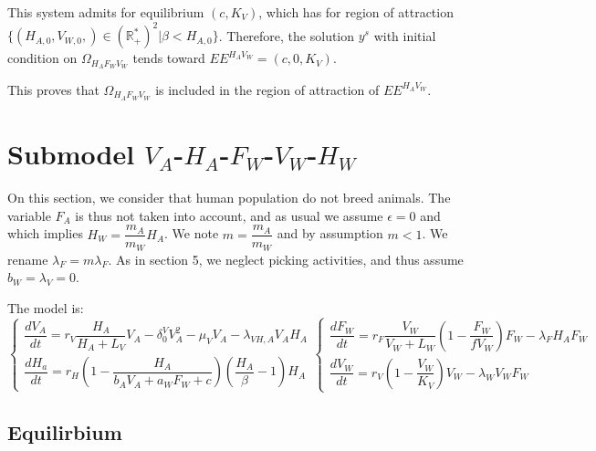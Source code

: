 \documentclass{article}
\newcommand{\lfw}{\lambda_{F}}
\newcommand{\lvw}{\lambda_{V}}
\newcommand{\lfv}{\lambda_{W}}
\begin{document}
This system admits for equilibrium $(c, K_V)$, which has for region of attraction $\Big\{(H_{A, 0}, V_{W, 0},) \in (\mathbb{R}_+^*)^2 | \beta < H_{A, 0} \Big\}$.  Therefore, the solution $y^s$ with initial condition on $\Omega_{H_AF_WV_W}$ tends toward $EE^{H_AV_W} = (c, 0, K_V)$.


This proves that $\Omega_{H_AF_WV_W}$ is included in the region of attraction of $EE^{H_AV_W}$.

\newpage
\section{Submodel $V_A$-$H_A$-$F_W$-$V_W$-$H_W$}
On this section, we consider that human population do not breed animals. The variable $F_A$ is thus not taken into account, and as usual we assume $\epsilon = 0$ and which implies $H_W = \dfrac{m_A}{m_W}H_A$. We note $m = \dfrac{m_A}{m_W}$ and by assumption $m < 1$. We rename $\lfw = m \lfw$. As in section 5, we neglect picking activities, and thus assume $b_W = \lvw = 0$.

The model is:
\begin{subequations}
\begin{equation}
\left\lbrace \begin{array}{l}
\dfrac{dV_{A}}{dt}=r_V  \dfrac{H_A}{H_A+L_V}V_A - \delta_0^V V_A^2-\mu_{V}V_A-\lambda_{VH,A}V_AH_A \\
\dfrac{dH_{a}}{dt}=r_{H}\left(1-\dfrac{H_A}{b_A V_A + a_{W}F_{W}+c}\right)\left(\dfrac{H_{A}}{\beta}-1\right)H_{A}
\end{array} \right.
\end{equation}
\begin{equation}
\left\lbrace \begin{array}{l}
\dfrac{dF_W}{dt} = r_F \dfrac{V_W}{V_W + L_W} \left(1 - \dfrac{F_W}{f V_W}\right) F_W - \lfw H_A F_W\\
\dfrac{dV_W}{dt} = r_V \left(1 - \dfrac{V_W}{K_V}\right) V_W - \lfv V_W F_W 
\end{array} \right.
\end{equation}
\label{anthropicWildVAHAFWVW}
\end{subequations}


\subsection{Equilirbium}
\end{document}
